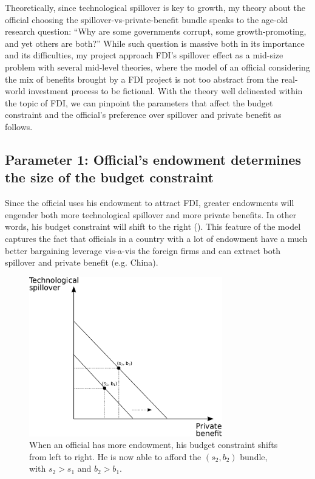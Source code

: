 Theoretically, since technological spillover is key to growth, my theory about the official choosing the spillover-vs-private-benefit bundle speaks to the age-old research question: ``Why are some governments corrupt, some growth-promoting, and yet others are both?'' While such question is massive both in its importance and its difficulties, my project approach FDI's spillover effect as a mid-size problem with several mid-level theories, where the model of an official considering the mix of benefits brought by a FDI project is not too abstract from the real-world investment process to be fictional. With the theory well delineated within the topic of FDI, we can pinpoint the parameters that affect the budget constraint and the official's preference over spillover and private benefit as follows.

\subsection{Parameter 1: Official's endowment determines the size of the budget constraint}

Since the official uses his endowment to attract FDI, greater endowments will engender both more technological spillover and more private benefits. In other words, his budget constraint will shift to the right (). This feature of the model captures the fact that officials in a country with a lot of endowment have a much better bargaining leverage vis-a-vis the foreign firms and can extract both spillover and private benefit (e.g. China).

\begin{figure}[!ht]
	\centering
    \includegraphics[width=0.75\textwidth, height=0.75\textheight,keepaspectratio]{../figure/budget_constraint}
    \caption{When an official has more endowment, his budget constraint shifts from left to right. He is now able to afford the $(s_2, b_2)$ bundle, with $s_2 > s_1$ and $b_2 > b_1$.}
    \label{fig:budget_constraint}
\end{figure}

